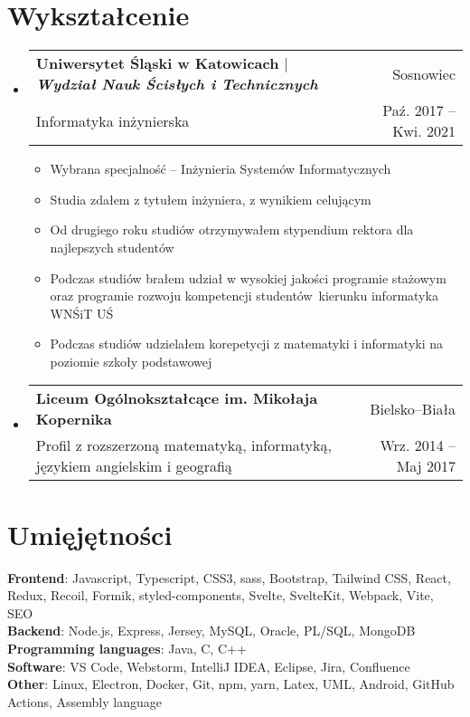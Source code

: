 \documentclass[A4,11pt]{article}
\makeatletter
\newcommand{\CVItem}[1]{\item\small{\setstretch{0.8}#1}}
\newcommand{\CVSubheading}[4]{
  \item
    \begin{tabular*}{0.97\textwidth}[t]{l@{\extracolsep{\fill}}r}
      \textbf{\setstretch{0.4}#1} & #2 \\
      \small#3 & \small #4 \\
    \end{tabular*}\vspace{3pt}
}
\newcommand{\CVSubHeadingListStart}{\begin{itemize}[leftmargin=0.5cm, label={}]}
\newcommand{\CVSubHeadingListEnd}{\end{itemize}}
\newcommand{\CVItemListStart}{\begin{itemize}\vspace{-8pt}}
\newcommand{\CVItemListEnd}{\end{itemize}\vspace{-1pt}}
\makeatother
\begin{document}
\section{Wykształcenie}
  \CVSubHeadingListStart
    \CVSubheading
      {Uniwersytet Śląski w Katowicach $|$ \emph{\small{Wydział Nauk Ścisłych i Technicznych}}}{Sosnowiec}
      {Informatyka inżynierska}{Paź. 2017 -- Kwi. 2021}
      \CVItemListStart
        \CVItem{Wybrana specjalność -- Inżynieria Systemów Informatycznych}
        \CVItem{Studia zdałem z tytułem inżyniera, z wynikiem celującym}
        \CVItem{Od drugiego roku studiów otrzymywałem stypendium rektora dla najlepszych studentów}
        \CVItem{Podczas studiów brałem udział w wysokiej jakości programie stażowym oraz programie rozwoju kompetencji studentów~kierunku informatyka WNŚiT UŚ}
        \CVItem{Podczas studiów udzielałem korepetycji z matematyki i informatyki na poziomie szkoły podstawowej}
      \CVItemListEnd
    \CVSubheading
      {Liceum Ogólnokształcące im. Mikołaja Kopernika}{Bielsko--Biała}
      {Profil z rozszerzoną matematyką, informatyką, językiem angielskim i geografią}{Wrz. 2014 -- Maj 2017}
  \CVSubHeadingListEnd



\section{Umięjętności}
  \begin{itemize}[leftmargin=0.5cm, label={}]
    \small{\item{
    \textbf{Frontend}{: Javascript, Typescript, CSS3, sass, Bootstrap, Tailwind CSS, React, Redux, Recoil, Formik, styled-components, Svelte, SvelteKit, Webpack, Vite, SEO}\\
    \textbf{Backend}{: Node.js, Express, Jersey, MySQL, Oracle, PL/SQL, MongoDB}\\
    \textbf{Programming languages}{: Java, C, C++}\\
    \textbf{Software}{: VS Code, Webstorm, IntelliJ IDEA, Eclipse, Jira, Confluence}\\
    \textbf{Other}{: Linux, Electron, Docker, Git, npm, yarn, Latex, UML, Android, GitHub Actions, Assembly language}
    }}
  \end{itemize}
\end{document}
